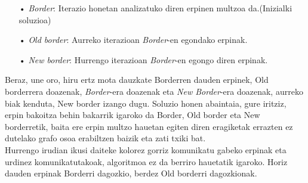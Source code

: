 \documentclass[eu,gi]{ifirak}\usepackage[]{graphicx}\usepackage[]{color}
\begin{document}
\begin{itemize}
\item[•]\textit{Border}: Iterazio honetan analizatuko diren erpinen multzoa da.(Inizialki soluzioa)
\item[•]\textit{Old border}: Aurreko iterazioan \textit{Border}-en egondako erpinak. 
\item[•]\textit{New border}: Hurrengo iterazioan \textit{Border}-en egongo diren erpinak. 
\end{itemize}

Beraz, une oro, hiru ertz mota dauzkate Borderren dauden erpinek, Old borderrera doazenak, \textit{Border}-era doazenak eta \textit{New Border}-era doazenak, aurreko biak kenduta, New border izango dugu. Soluzio honen abaintaia, gure iritziz, erpin bakoitza behin bakarrik igaroko da Border, Old border eta New borderretik, baita ere erpin multzo hauetan egiten diren eragiketak errazten ez dutelako grafo osoa erabiltzen baizik eta zati txiki bat.\\

Hurrengo irudian ikusi daiteke kolorez gorriz komunikatu gabeko erpinak eta urdinez komunikatutakoak, algoritmoa ez da berriro hauetatik igaroko. Horiz dauden erpinak Borderri dagozkio, berdez Old borderri dagozkionak.
\end{document}
